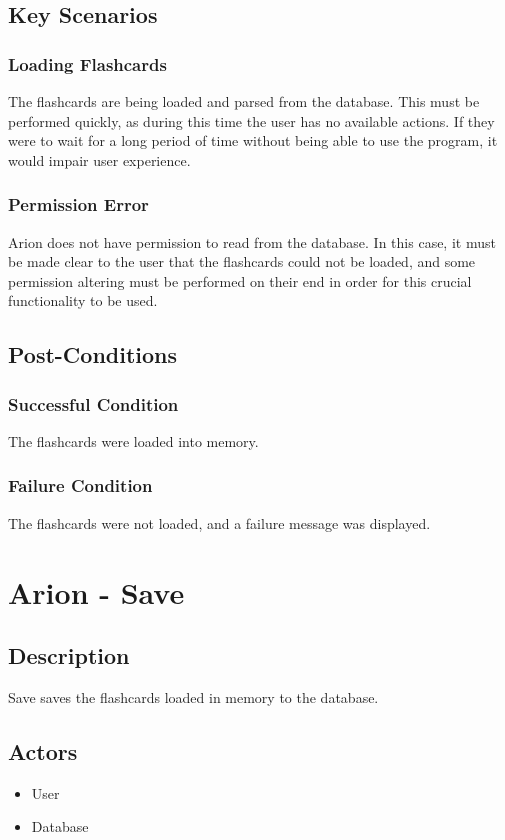 \documentclass{scrreprt}
\begin{document}
\section{Key Scenarios}
    \subsection{Loading Flashcards}
    The flashcards are being loaded and parsed from the database.
    This must be performed quickly, as during this time the user has no available actions.
    If they were to wait for a long period of time without being able to use the program,
    it would impair user experience.

    \subsection{Permission Error}
    Arion does not have permission to read from the database.
    In this case, it must be made clear to the user that the flashcards could not
    be loaded, and some permission altering must be performed on their end in order
    for this crucial functionality to be used.
    
\section{Post-Conditions}
    \subsection{Successful Condition}
    The flashcards were loaded into memory.

    \subsection{Failure Condition}
    The flashcards were not loaded, and a failure message was displayed.


\chapter{Arion - Save}

\section{Description}
Save saves the flashcards loaded in memory to the database.

\section{Actors}
\begin{itemize}
    \item User
    \item Database
\end{itemize}
\end{document}

